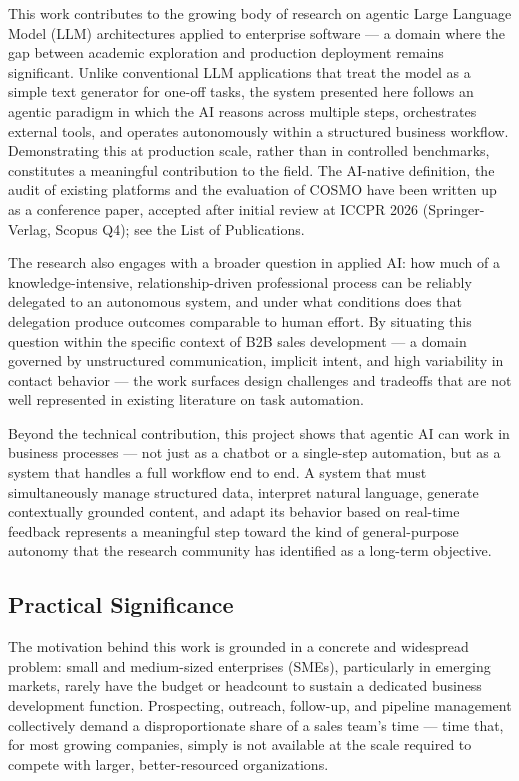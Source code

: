 \documentclass[a4paper]{article}
\begin{document}
This work contributes to the growing body of research on agentic Large Language Model (LLM) architectures applied to enterprise software — a domain where the gap between academic exploration and production deployment remains significant. Unlike conventional LLM applications that treat the model as a simple text generator for one-off tasks, the system presented here follows an agentic paradigm in which the AI reasons across multiple steps, orchestrates external tools, and operates autonomously within a structured business workflow. Demonstrating this at production scale, rather than in controlled benchmarks, constitutes a meaningful contribution to the field. The AI-native definition, the audit of existing platforms and the evaluation of COSMO have been written up as a conference paper, accepted after initial review at ICCPR 2026 (Springer-Verlag, Scopus Q4); see the List of Publications.

The research also engages with a broader question in applied AI: how much of a knowledge-intensive, relationship-driven professional process can be reliably delegated to an autonomous system, and under what conditions does that delegation produce outcomes comparable to human effort. By situating this question within the specific context of B2B sales development — a domain governed by unstructured communication, implicit intent, and high variability in contact behavior — the work surfaces design challenges and tradeoffs that are not well represented in existing literature on task automation.

Beyond the technical contribution, this project shows that agentic AI can work in business processes — not just as a chatbot or a single-step automation, but as a system that handles a full workflow end to end. A system that must simultaneously manage structured data, interpret natural language, generate contextually grounded content, and adapt its behavior based on real-time feedback represents a meaningful step toward the kind of general-purpose autonomy that the research community has identified as a long-term objective.
\subsection{Practical Significance}

The motivation behind this work is grounded in a concrete and widespread problem: small and medium-sized enterprises (SMEs), particularly in emerging markets, rarely have the budget or headcount to sustain a dedicated business development function. Prospecting, outreach, follow-up, and pipeline management collectively demand a disproportionate share of a sales team's time — time that, for most growing companies, simply is not available at the scale required to compete with larger, better-resourced organizations.
\end{document}
